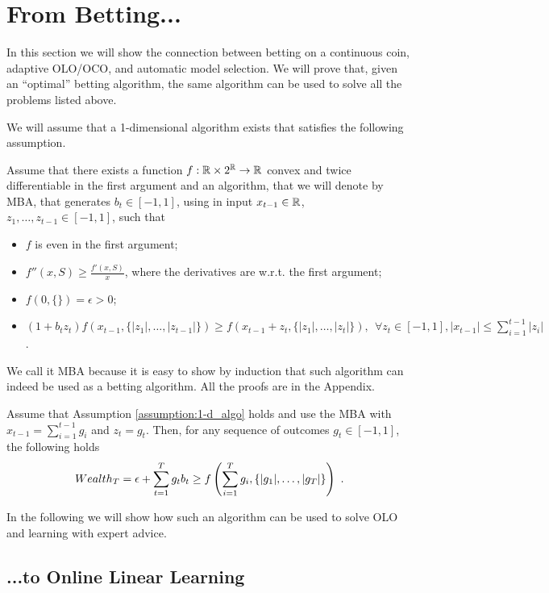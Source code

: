 \section{From Betting...}

In this section we will show the connection between betting on a continuous coin, adaptive \ac{OLO}/\ac{OCO}, and automatic model selection. We will prove that, given an ``optimal'' betting algorithm, the same algorithm can be used to solve all the problems listed above.

We will assume that a 1-dimensional algorithm exists that satisfies the following assumption.
\begin{assumption}
\label{assumption:1-d_algo}
Assume that there exists a function $f:\mathbb{R} \times 2^{\mathbb{R}} \rightarrow \mathbb{R}$ convex and twice differentiable in the first argument and an algorithm, that we will denote by \ac{MBA}, that generates $b_t \in [-1 , 1]$, using in input $x_{t-1} \in \mathbb{R}$, $z_1, \ldots, z_{t-1} \in [-1,1]$, such that
\begin{itemize}
\item $f$ is even in the first argument;
\item $f''(x, S) \geq \frac{f'(x,S)}{x}$, where the derivatives are w.r.t. the first argument;
\item $f(0,\{\})=\epsilon>0$;
\item  $
(1+b_t z_t) f\left( x_{t-1}, \{|z_1|, \ldots, |z_{t-1}|\} \right) \geq f\left( x_{t-1}+z_t, \{|z_1|, \ldots, |z_t|\}\right), \ \ \forall z_{t} \in [-1,1], |x_{t-1}| \leq \sum_{i=1}^{t-1} |z_i|
$.
\end{itemize}
\end{assumption}

We call it \ac{MBA} because it is easy to show by induction that such algorithm can indeed be used as a betting algorithm.
All the proofs are in the Appendix.
\begin{theorem}
\label{theo:1-d_reward}
Assume that Assumption \ref{assumption:1-d_algo} holds and use the \ac{MBA} with $x_{t-1}=\sum_{i=1}^{t-1} g_i$ and $z_t=g_t$.
Then, for any sequence of outcomes $g_t \in [-1,1]$, the following holds
\[
Wealth_T = \epsilon+\sum_{t=1}^T g_t b_t \geq f\left( \sum_{i=1}^{T} g_i , \left\{|g_1|, \ldots, |g_T|\right\}\right)~.
\]
\end{theorem}

In the following we will show how such an algorithm can be used to solve \ac{OLO} and learning with expert advice.

\subsection{...to Online Linear Learning}

